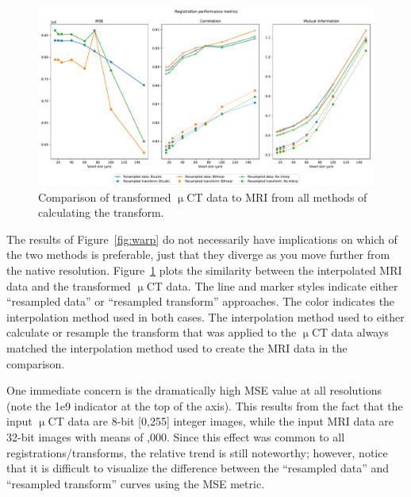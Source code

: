 \documentclass[11pt]{article}
\begin{document}
\begin{figure}[h]
  \centering
  \includegraphics[width=\linewidth]{../results/plots/warped_image}
  \captionsetup{width=0.95\linewidth}
  \caption{Comparison of transformed $\upmu$CT data to MRI from all methods
  of calculating the transform.}
  \label{fig:warped}
\end{figure}

The results of Figure~\ref{fig:warp} do not necessarily have implications on
which of the two methods is preferable, just that they diverge as you move
further from the native resolution. Figure~\ref{fig:warped} plots the similarity
between the interpolated MRI data and the transformed $\upmu$CT data. The line
and marker styles indicate either ``resampled data'' or ``resampled transform''
approaches. The color indicates the interpolation method used in both cases. The
interpolation method used to either calculate or resample the transform that was
applied to the $\upmu$CT data always matched the interpolation method used to
create the MRI data in the comparison.

One immediate concern is the dramatically high MSE value at all resolutions
(note the 1e9 indicator at the top of the axis). This results from the fact that
the input $\upmu$CT data are 8-bit [0,255] integer images, while the input MRI
data are 32-bit images with means of ,000. Since this effect was
common to all registrations/transforms, the relative trend is still noteworthy;
however, notice that it is difficult to visualize the difference between the
``resampled data'' and ``resampled transform'' curves using the MSE metric.
\end{document}
